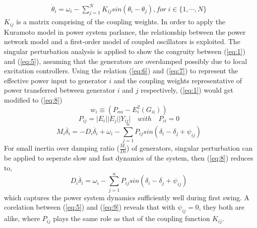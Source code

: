 \documentclass{ifacconf}
\begin{document}
\begin{align} \label{eq:5}
\dot \theta_{i}=\omega_{i}-\sum_{j=1}^{N} K_{ij} sin (\theta_{i}-\theta_{j}),  for\;i \in \lbrace1,\cdots,N \rbrace 
\end{align}
$K_{ij}$ is a matrix comprising of the coupling weights. In order to apply the Kuramoto model in power system parlance, the relationship between the power network model and a first-order model of coupled oscillators is exploited. 
The singular perturbation analysis is applied to show the congruity between (\ref{eq:1}) and (\ref{eq:5}), assuming that the generators are overdamped possibly due to local excitation controllers.
Using the relation (\ref{eq:6}) and (\ref{eq:7}) to represent the effective power input to generator $i$ and the coupling weights representative of power transferred between generator $i$ and $j$ respectively, (\ref{eq:1}) would get modified to (\ref{eq:8})
\begin{equation} \label{eq:6}
w_{i} \equiv (P_{mi}-E_{i}^{2}(G_{ii}))
\end{equation}
\begin{equation} \label{eq:7}
P_{ij}=\vert E_{i}\vert\vert E_{j}\vert \vert Y_{ij} \vert \quad with \quad P_{ii}=0
\end{equation}
\begin{equation} \label{eq:8}
M_{i}\ddot{\delta_{i}}=-D_{i}\dot{\delta_{i}}+\omega_{i}-\sum_{j=1}^{n}P_{ij}sin(\delta_{i}-\delta_{j}+\psi_{ij})
\end{equation}
For small inertia over damping ratio ($\frac{M_{i}}{D{i}}$) of generators, singular perturbation can be applied to seperate slow and fast dynamics of the system, then (\ref{eq:8}) reduces to,
\begin{equation} \label{eq:9}
D_{i}\dot{\delta_{i}}=\omega_{i}-\sum_{j=1}^{n}P_{ij}sin(\delta_{i}-\delta_{j}+\psi_{ij})
\end{equation}
which captures the power system dynamics sufficiently well during first swing. A corelation between (\ref{eq:5}) and (\ref{eq:9}) reveals that with $\psi_{ij}=0$, they both are alike, where $P_{ij} $ plays the same role as that of the coupling function $K_{ij}$. 
\end{document}

